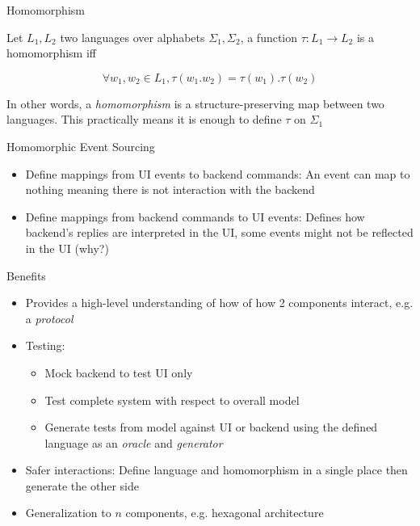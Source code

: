 \begin{frame}[fragile]{Homomorphism}

Let $L_1, L_2$ two languages over alphabets $\Sigma_1, \Sigma_2$, a function $\tau : L_1 \rightarrow L_2$ is a homomorphism iff

  \[
  \forall w_1, w_2 \in L_1, \tau (w_1 . w_2) = \tau (w_1) . \tau (w_2)
  \]

  In other words, a \emph{homomorphism} is a structure-preserving map between two languages. This practically means it is enough to
  define $\tau$ on $\Sigma_1$

\end{frame}

\begin{frame}[fragile]{Homomorphic Event Sourcing}
  \begin{itemize}
  \item Define mappings from UI events to backend commands: An event
    can map to nothing meaning there is not interaction with
    the backend
  \item Define mappings from backend commands to UI events: Defines how
    backend's replies are interpreted in the UI, some events might not
    be reflected in the UI (why?)
  \end{itemize}
\end{frame}

\begin{frame}[fragile]{Benefits}
  \begin{itemize}
  \item Provides a high-level understanding of how of how 2 components
    interact, e.g. a \emph{protocol}
  \item Testing:
    \begin{itemize}
    \item Mock backend to test UI only
    \item Test complete system with respect to overall model
    \item Generate tests from model against UI or backend using the
      defined language as an \emph{oracle} and \emph{generator}
    \end{itemize}
  \item Safer interactions: Define language and homomorphism in a
    single place then generate the other side
  \item Generalization to $n$ components, e.g. hexagonal architecture
  \end{itemize}
\end{frame}


